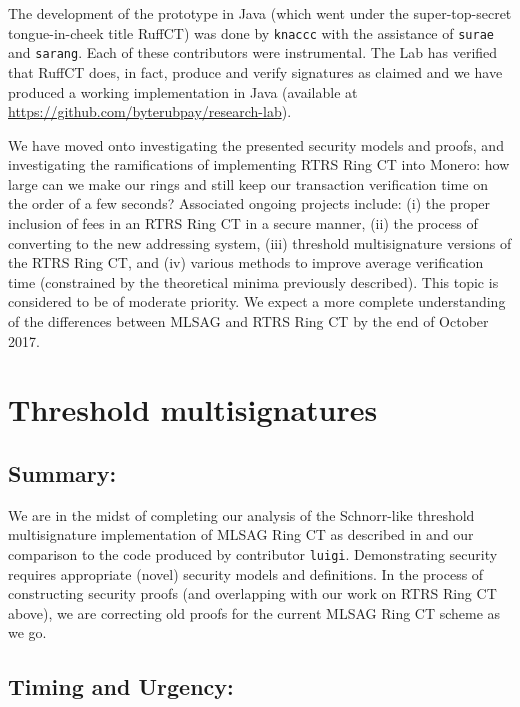 \documentclass[12pt,english]{mrl}
\theoremstyle{definition}
\numberwithin{equation}{section}
\numberwithin{figure}{section}
\numberwithin{equation}{section}
\numberwithin{equation}{section}
\numberwithin{figure}{section}
\begin{document}
The development of the prototype in Java (which went under the super-top-secret tongue-in-cheek title RuffCT) was done by \texttt{knaccc} with the assistance of \texttt{surae} and \texttt{sarang}. Each of these contributors were instrumental. The Lab has verified that RuffCT does, in fact, produce and verify signatures as claimed and we have produced a working implementation in Java (available at \url{https://github.com/byterubpay/research-lab}). 

We have moved onto investigating the presented security models and proofs, and investigating the ramifications of implementing RTRS Ring CT into Monero: how large can we make our rings and still keep our transaction verification time on the order of a few seconds? Associated ongoing projects include: (i) the proper inclusion of fees in an RTRS Ring CT in a secure manner, (ii) the process of converting to the new addressing system, (iii) threshold multisignature versions of the RTRS Ring CT, and (iv) various methods to improve average verification time (constrained by the theoretical minima previously described). This topic is considered to be of moderate priority. We expect a more complete understanding of the differences between MLSAG and RTRS Ring CT by the end of October 2017.








\section{Threshold multisignatures} 

\subsection{Summary:} 

We are in the midst of completing our analysis of the Schnorr-like threshold multisignature implementation of MLSAG Ring CT as described in \cite{noether2016ring} and our comparison to the code produced by contributor \texttt{luigi}. Demonstrating security requires appropriate (novel) security models and definitions. In the process of constructing security proofs (and overlapping with our work on RTRS Ring CT above), we are correcting old proofs for the current MLSAG Ring CT scheme as we go.

\subsection{Timing and Urgency:} 
\end{document}
